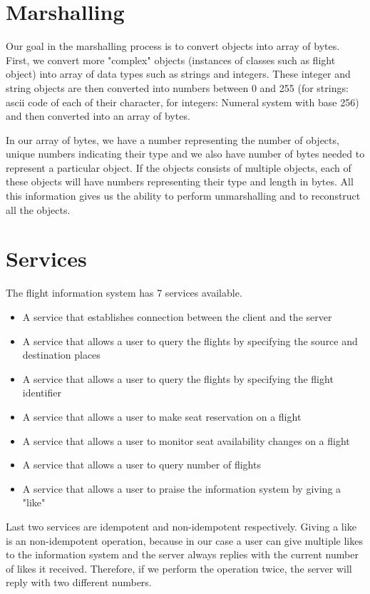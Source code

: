 \documentclass[12pt,a4paper]{article}
\begin{document}
\section{Marshalling}
Our goal in the marshalling process is to convert objects into array of bytes. First, we convert more "complex" objects (instances of classes such as flight object) into array of data types such as strings and integers. These integer and string objects are then converted into numbers between 0 and 255 (for strings: ascii code of each of their character, for integers: Numeral system with base 256) and then converted into an array of bytes.\par \medskip
In our array of bytes, we have a number representing the number of objects, unique numbers indicating their type and we also have number of bytes needed to represent a particular object. If the objects consists of multiple objects, each of these objects will have numbers representing their type and length in bytes. All this information gives us the ability to perform unmarshalling and to reconstruct all the objects. 
\pagebreak
\section{Services}
The flight information system has 7 services available.
\renewcommand\labelitemi{\tiny$\bullet$}
\begin{itemize}
    \setlength\itemsep{0.15em}
	\item A service that establishes connection between the client and the server
	\item A service that allows a user to query the flights by specifying the source and destination places
	\item A service that allows a user to query the flights by specifying the flight identifier
    \item A service that allows a user to make seat reservation on a flight
    \item A service that allows a user to monitor seat availability changes on a flight
    \item A service that allows a user to query number of flights
    \item A service that allows a user to praise the information system by giving a "like"
\end{itemize}
Last two services are idempotent and non-idempotent respectively. Giving a like is an non-idempotent operation, because in our case a user can give multiple likes to the information system and the server always replies with the current number of likes it received. Therefore, if we perform the operation twice, the server will reply with two different numbers.
\end{document}

